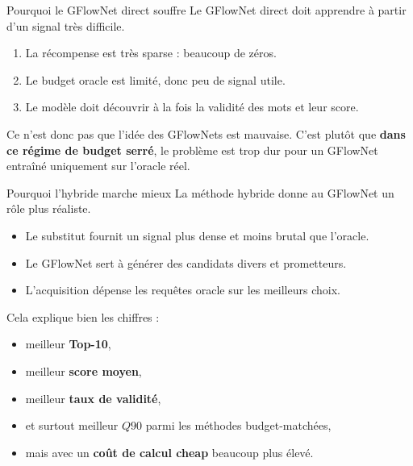 \documentclass[aspectratio=169,10pt]{beamer}
\begin{document}
\begin{frame}{Pourquoi le GFlowNet direct souffre}
\justifying
Le GFlowNet direct doit apprendre à partir d'un signal très difficile.

\begin{enumerate}
  \item La récompense est très sparse : beaucoup de zéros.
  \item Le budget oracle est limité, donc peu de signal utile.
  \item Le modèle doit découvrir à la fois la validité des mots et leur score.
\end{enumerate}

\vspace{0.5em}
Ce n'est donc pas que l'idée des GFlowNets est mauvaise. C'est plutôt que
\textbf{dans ce régime de budget serré}, le problème est trop dur pour un
GFlowNet entraîné uniquement sur l'oracle réel.
\end{frame}

\begin{frame}{Pourquoi l'hybride marche mieux}
\justifying
La méthode hybride donne au GFlowNet un rôle plus réaliste.

\begin{itemize}
  \item Le substitut fournit un signal plus dense et moins brutal que l'oracle.
  \item Le GFlowNet sert à générer des candidats divers et prometteurs.
  \item L'acquisition dépense les requêtes oracle sur les meilleurs choix.
\end{itemize}

\vspace{0.5em}
Cela explique bien les chiffres :
\begin{itemize}
  \item meilleur \textbf{Top-10},
  \item meilleur \textbf{score moyen},
  \item meilleur \textbf{taux de validité},
  \item et surtout meilleur \textbf{\(Q90\)} parmi les méthodes budget-matchées,
  \item mais avec un \textbf{coût de calcul cheap} beaucoup plus élevé.
\end{itemize}
\end{frame}
\end{document}
